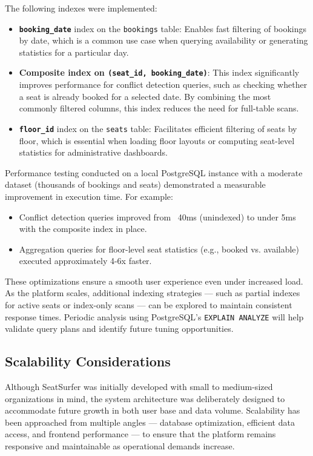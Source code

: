 \documentclass[12pt,a4paper]{report} %
\begin{document}
The following indexes were implemented:

\begin{itemize}
\item \textbf{\texttt{booking\_date}} index on the \texttt{bookings} table: Enables fast filtering of bookings by date, which is a common use case when querying availability or generating statistics for a particular day.
\item \textbf{Composite index on \texttt{(seat\_id, booking\_date)}}: This index significantly improves performance for conflict detection queries, such as checking whether a seat is already booked for a selected date. By combining the most commonly filtered columns, this index reduces the need for full-table scans.
\item \textbf{\texttt{floor\_id}} index on the \texttt{seats} table: Facilitates efficient filtering of seats by floor, which is essential when loading floor layouts or computing seat-level statistics for administrative dashboards.
\end{itemize}

Performance testing conducted on a local PostgreSQL instance with a moderate dataset (thousands of bookings and seats) demonstrated a measurable improvement in execution time. For example:

\begin{itemize}
\item Conflict detection queries improved from ~40ms (unindexed) to under 5ms with the composite index in place.
\item Aggregation queries for floor-level seat statistics (e.g., booked vs. available) executed approximately 4-6x faster.
\end{itemize}

These optimizations ensure a smooth user experience even under increased load. As the platform scales, additional indexing strategies — such as partial indexes for active seats or index-only scans — can be explored to maintain consistent response times. Periodic analysis using PostgreSQL's \texttt{EXPLAIN ANALYZE} will help validate query plans and identify future tuning opportunities.

\subsection{Scalability Considerations}

Although SeatSurfer was initially developed with small to medium-sized organizations in mind, the system architecture was deliberately designed to accommodate future growth in both user base and data volume. Scalability has been approached from multiple angles — database optimization, efficient data access, and frontend performance — to ensure that the platform remains responsive and maintainable as operational demands increase.
\end{document}
